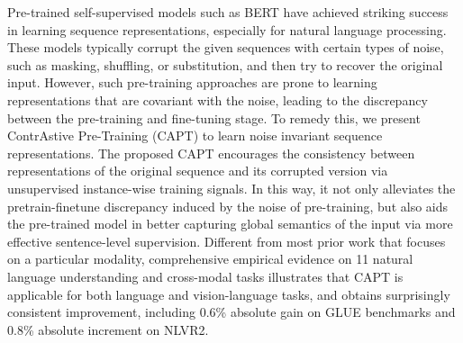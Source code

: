 Pre-trained self-supervised models such as BERT have achieved striking success in learning sequence representations, especially for natural language processing. These models typically corrupt the given sequences with certain types of noise, such as masking, shuffling, or substitution, and then try to recover the original input. However, such pre-training approaches are prone to learning representations that are covariant with the noise, leading to the discrepancy between the pre-training and fine-tuning stage. To remedy this, we present ContrAstive Pre-Training (CAPT) to learn noise invariant sequence representations. The proposed CAPT encourages the consistency between representations of the original sequence and its corrupted version via unsupervised instance-wise training signals. In this way, it not only alleviates the pretrain-finetune discrepancy induced by the noise of pre-training, but also aids the pre-trained model in better capturing global semantics of the input via more effective sentence-level supervision. Different from most prior work that focuses on a particular modality, comprehensive empirical evidence on 11 natural language understanding and cross-modal tasks illustrates that CAPT is applicable for both language and vision-language tasks, and obtains surprisingly consistent improvement, including 0.6\% absolute gain on GLUE benchmarks and 0.8\% absolute increment on NLVR2.
